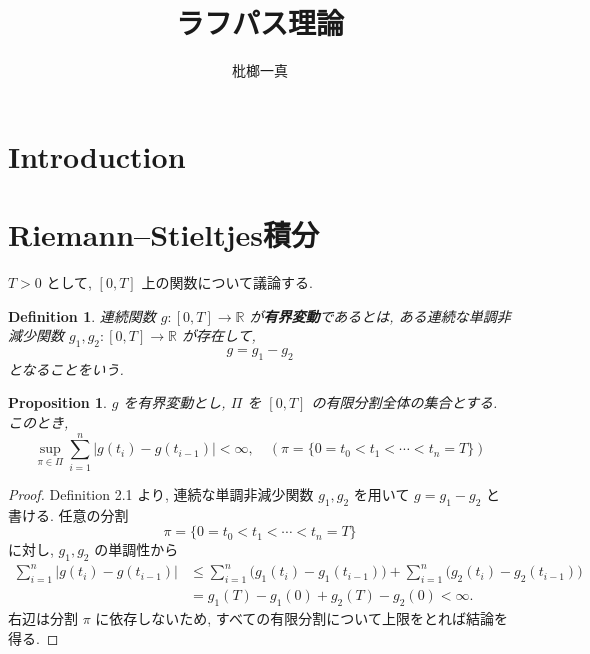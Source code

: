 \documentclass[11pt]{article}
\title{ラフパス理論}
\author{枇榔一真}
\theoremstyle{breakstyle}
\newtheorem{proposition}[theorem]{Proposition}
\newtheorem{definition}[theorem]{Definition}
\begin{document}
\maketitle

\begin{abstract}
\end{abstract}
\section{Introduction}

\section{Riemann–Stieltjes積分}
$T>0$ として, $[0,T]$ 上の関数について議論する.
\begin{definition}
    連続関数 $g : [0,T]\rightarrow \mathbb{R}$ が\textbf{有界変動}であるとは, ある連続な単調非減少関数
    $g_1, g_2: [0,T]\rightarrow \mathbb{R}$ が存在して, 
    \begin{equation*}
        g=g_1-g_2
    \end{equation*}
    となることをいう.
\end{definition}
\begin{proposition}
    $g$ を有界変動とし, $\Pi$ を $[0,T]$ の有限分割全体の集合とする. このとき, 
    \begin{equation*}
        \sup\limits_{\pi \in\Pi} \sum_{i=1}^{n}|g(t_i)-g(t_{i-1})|<\infty, \quad (\pi=\{0=t_0<t_1<\cdots<t_n=T\})
    \end{equation*}
\end{proposition}
\begin{proof}
    Definition 2.1 より, 連続な単調非減少関数 $g_1,g_2$ を用いて
    $g=g_1-g_2$ と書ける. 任意の分割
    \begin{equation*}
        \pi=\{0=t_0<t_1<\cdots<t_n=T\}
    \end{equation*}
    に対し, $g_1,g_2$ の単調性から
    \begin{align*}
        \sum_{i=1}^n |g(t_i)-g(t_{i-1})|
        &\leq
        \sum_{i=1}^n \bigl(g_1(t_i)-g_1(t_{i-1})\bigr)
        +
        \sum_{i=1}^n \bigl(g_2(t_i)-g_2(t_{i-1})\bigr) \\
        &=g_1(T)-g_1(0)+g_2(T)-g_2(0)<\infty.
    \end{align*}
    右辺は分割 $\pi$ に依存しないため, すべての有限分割について上限をとれば結論を得る.
\end{proof}
\end{document}
